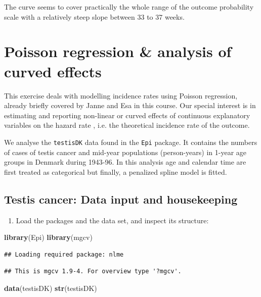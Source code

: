 \documentclass[
]{book}
\newenvironment{Shaded}{\begin{snugshade}}{\end{snugshade}}
\newcommand{\FunctionTok}[1]{\textcolor[rgb]{0.13,0.29,0.53}{\textbf{#1}}}
\newcommand{\NormalTok}[1]{#1}
\providecommand{\tightlist}{%
  \setlength{\itemsep}{0pt}\setlength{\parskip}{0pt}}
\theoremstyle{definition}
\theoremstyle{definition}
\theoremstyle{definition}
\theoremstyle{definition}
\theoremstyle{remark}
\begin{document}
The curve seems to cover practically the whole range of
the outcome probability scale with a relatively
steep slope between 33 to 37 weeks.

\chapter{Poisson regression \& analysis of curved effects}\label{poisson-regression-analysis-of-curved-effects}

This exercise deals with modelling incidence rates using Poisson
regression, already briefly covered by Janne and Esa in this course. Our
special interest is in estimating and reporting non-linear or curved
effects of continuous explanatory variables on the hazard rate , i.e.
the theoretical incidence rate of the outcome.

We analyse the \texttt{testisDK} data found in the \texttt{Epi} package. It contains
the numbers of cases of testis cancer and mid-year populations
(person-years) in 1-year age groups in Denmark during 1943-96. In this
analysis age and calendar time are first treated as categorical but
finally, a penalized spline model is fitted.

\section{Testis cancer: Data input and housekeeping}\label{testis-cancer-data-input-and-housekeeping}

\begin{enumerate}
\def\labelenumi{\arabic{enumi}.}
\tightlist
\item
  Load the packages and the data set, and inspect its structure:
\end{enumerate}

\begin{Shaded}
\begin{Highlighting}[]
\FunctionTok{library}\NormalTok{(Epi)}
\FunctionTok{library}\NormalTok{(mgcv)}
\end{Highlighting}
\end{Shaded}

\begin{verbatim}
## Loading required package: nlme
\end{verbatim}

\begin{verbatim}
## This is mgcv 1.9-4. For overview type '?mgcv'.
\end{verbatim}

\begin{Shaded}
\begin{Highlighting}[]
\FunctionTok{data}\NormalTok{(testisDK)}
\FunctionTok{str}\NormalTok{(testisDK)}
\end{Highlighting}
\end{Shaded}
\end{document}
